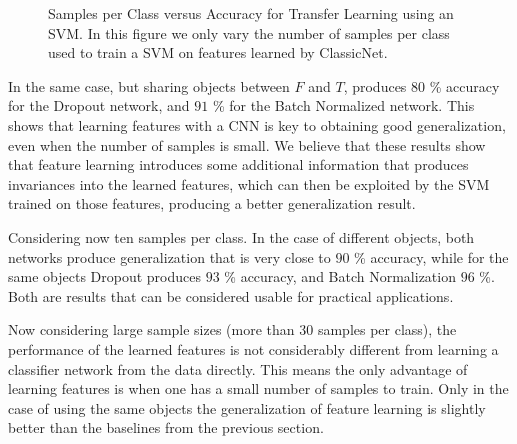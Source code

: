 \begin{figure*}[t]
{
	}
	\vspace*{0.5cm}
    \forcerectofloat
	\caption[Samples per Class versus Accuracy for Transfer Learning using an SVM]{Samples per Class versus Accuracy for Transfer Learning using an SVM. In this figure we only vary the number of samples per class used to train a SVM on features learned by ClassicNet.}
	\label{lim:transferLearningSPCVsAccuracy}
\end{figure*}

In the same case, but sharing objects between $F$ and $T$, produces $80$ \% accuracy for the Dropout network, and $91$ \% for the Batch Normalized network. This shows that learning features with a CNN is key to obtaining good generalization, even when the number of samples is small. We believe that these results show that feature learning introduces some additional information that produces invariances into the learned features, which can then be exploited by the SVM trained on those features, producing a better generalization result.

Considering now ten samples per class. In the case of different objects, both networks produce generalization that is very close to $90$ \% accuracy, while for the same objects Dropout produces $93$ \% accuracy, and Batch Normalization $96$ \%. Both are results that can be considered usable for practical applications.

Now considering large sample sizes (more than 30 samples per class), the performance of the learned features is not considerably different from learning a classifier network from the data directly. This means the only advantage of learning features is when one has a small number of samples to train. Only in the case of using the same objects the generalization of feature learning is slightly better than the baselines from the previous section.

